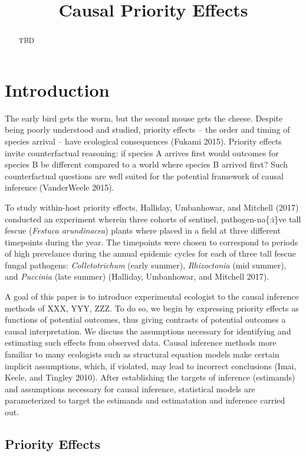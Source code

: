 \documentclass[]{article}
\title{Causal Priority Effects}
\author{}
\date{}
\begin{document}
\maketitle
\begin{abstract}
TBD
\end{abstract}

\section{Introduction}\label{introduction}

The early bird gets the worm, but the second mouse gets the cheese.
Despite being poorly understood and studied, priority effects -- the
order and timing of species arrival -- have ecological consequences
(Fukami 2015). Priority effects invite counterfactual reasoning: if
species A arrives first would outcomes for species B be different
compared to a world where species B arrived first? Such counterfactual
questions are well suited for the potential framework of causal
inference (VanderWeele 2015).

To study within-host priority effects, Halliday, Umbanhowar, and
Mitchell (2017) conducted an experiment wherein three cohorts of
sentinel, pathogen-na\{:i\}ve tall fescue (\emph{Festuca arundinacea})
plants where placed in a field at three different timepoints during the
year. The timepoints were chosen to correspond to periods of high
prevelance during the annual epidemic cycles for each of three tall
fescue fungal pathogens: \emph{Colletotrichum} (early summer),
\emph{Rhizoctonia} (mid summer), and \emph{Puccinia} (late summer)
(Halliday, Umbanhowar, and Mitchell 2017).

A goal of this paper is to introduce experimental ecologist to the
causal inference methods of XXX, YYY, ZZZ. To do so, we begin by
expressing priority effects as functions of potential outcomes, thus
giving contrasts of potential outcomes a causal interpretation. We
discuss the assumptions necessary for identifying and estimating such
effects from observed data. Causal inference methods more familiar to
many ecologists such as structural equation models make certain implicit
assumptions, which, if violated, may lead to incorrect conclusions
(Imai, Keele, and Tingley 2010). After establishing the targets of
inference (estimands) and assumptions necessary for causal inference,
statistical models are parameterized to target the estimands and
estimatation and inference carried out.

\subsection{Priority Effects}\label{priority-effects}
\end{document}

